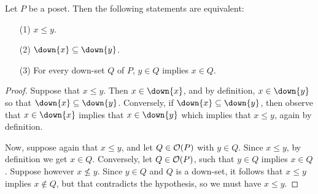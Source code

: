 \begin{lemma}\label{lemma_1.6.3}
  Let $P$ be a poset. Then the following statements are equivalent:
  \begin{enumerate}
    \item[(1)] $x \leq y$.

    \item[(2)] $\down{x} \subseteq \down{y}$.

    \item[(3)] For every down-set $Q$ of $P$, $y \in Q$ implies $x \in
      Q$.
  \end{enumerate}
\end{lemma}
\begin{proof}
  Suppose that $x \leq y$. Then $x \in \down{x}$, and by definition,
  $x \in \down{y}$ so that $\down{x} \subseteq \down{y}$. Conversely,
  if $\down{x} \subseteq \down{y}$, then observe that $x \in \down{x}$
  implies that $x \in \down{y}$ which implies that $x \leq y$, again
  by definition.

  Now, suppose again that $x \leq y$, and let $Q \in \mathcal{O}(P)$ with $y
  \in Q$. Since $x \leq y$, by definition we get $x \in Q$.
  Conversely, let $Q \in \mathcal{O}(P)$, such that $y \in Q$ implies $x \in
  Q$. Suppose however $x \nleq y$. Since $y \in Q$ and $Q$ is a
  down-set, it follows that $x \leq y$ implies $x \not\in Q$, but that
  contradicts the hypothesis, so we must have $x \leq y$.
\end{proof}

